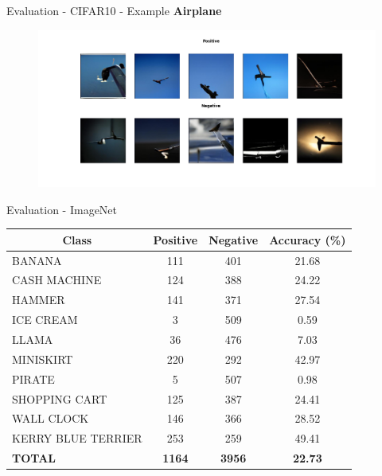 \documentclass[t]{beamer}
\begin{document}
\begin{frame}[c]{Evaluation - CIFAR10 - Example}
\textbf{Airplane}
\begin{figure}
    \centering
    \includegraphics[scale=0.25]{airplane.png}
\end{figure} 
\end{frame}

\begin{frame}[c]{Evaluation - ImageNet}
\fontsize{10}{7.2}\selectfont
\begin{table}[h!]
\begin{tabular}{|l|c|c|c|}
\hline
\multicolumn{1}{|c|}{\textbf{Class}} & \textbf{Positive} & \textbf{Negative} & \textbf{Accuracy (\%)}       \\ \hline
BANANA                               & 111               & 401               & {\color[HTML]{000000} 21.68} \\ \hline
CASH MACHINE                         & 124               & 388               & 24.22                        \\ \hline
HAMMER                               & 141               & 371               & 27.54                        \\ \hline
ICE CREAM                            & 3                 & 509               & {\color[HTML]{FE0000} 0.59}  \\ \hline
LLAMA                                & 36                & 476               & {\color[HTML]{333333} 7.03}  \\ \hline
MINISKIRT                            & 220               & 292               & 42.97                        \\ \hline
PIRATE                               & 5                 & 507               & 0.98                         \\ \hline
SHOPPING CART                        & 125               & 387               & 24.41                        \\ \hline
WALL CLOCK                           & 146               & 366               & 28.52                        \\ \hline
KERRY BLUE TERRIER                   & 253               & 259               & {\color[HTML]{32CB00} 49.41} \\ \hline
\textbf{TOTAL}                       & \textbf{1164}     & \textbf{3956}     & \textbf{22.73}               \\ \hline
\end{tabular}
\end{table}
\end{frame}
\end{document}

